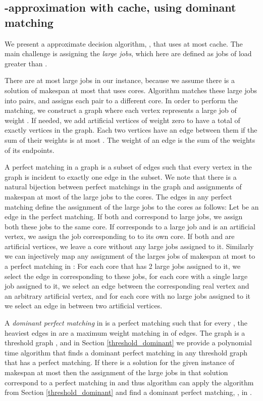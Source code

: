 \documentclass[11pt]{article}
\begin{document}
\subsection{-approximation with  cache, using dominant matching}\label{slmc_43}
We present a  approximate decision algorithm, , that uses at most  cache.
The main challenge is assigning the \textit{large jobs}, which here are defined as jobs of load greater than .

There are at most  large jobs in our instance, because we assume there is a solution of makespan at most  that uses  cores.
Algorithm  matches these large jobs into pairs, and assigns each pair to a different core.
In order to perform the matching, we construct a graph  where each vertex represents a large job  of weight . If needed, we add artificial vertices of weight zero to have a total of exactly  vertices in the graph.  Each two vertices have an edge between them if the sum of their weights is at most . The weight of an edge is the sum of the weights of its endpoints.

A perfect matching in a graph is a subset of edges such that every vertex in the graph is incident to exactly one edge in the subset. We note that there is a natural bijection between perfect matchings  in the graph  and assignments of makespan at most  of the large jobs to the cores.
The  edges in any perfect matching define the assignment of the large jobs to the  cores as follows: Let  be an edge in the perfect matching.
If both  and  correspond to large jobs, we assign both these jobs to the same core.
If  corresponds to a large job and  is an artificial vertex, we assign the job corresponding to  to its own core.
If both  and  are artificial vertices, we leave a core without any large jobs assigned to it. Similarly we can injectively map any assignment of the larges  jobs of makespan at most  to a perfect matching in : For each core that has 2 large jobs assigned to it, we select the edge in  corresponding to these jobs, for each core with a single large job assigned to it, we select an edge between the corresponding real vertex and an arbitrary artificial vertex, and for each core with no large jobs assigned to it we select an edge in  between two artificial vertices.

 A \textit{dominant perfect matching} in  is a perfect matching  such that for every , the  heaviest edges in  are a maximum weight matching in  of  edges.
The graph  is a threshold graph \cite{MP95}, and in Section \ref{threshold_dominant} we provide a polynomial time algorithm that finds a dominant perfect matching in any threshold graph that has a perfect matching. If there is a solution for the given instance of makespan at most  then the assignment of the large jobs in that solution correspond to a perfect matching in  and thus algorithm  can apply the algorithm from Section \ref{threshold_dominant} and find a dominant perfect matching, , in .
\end{document}
